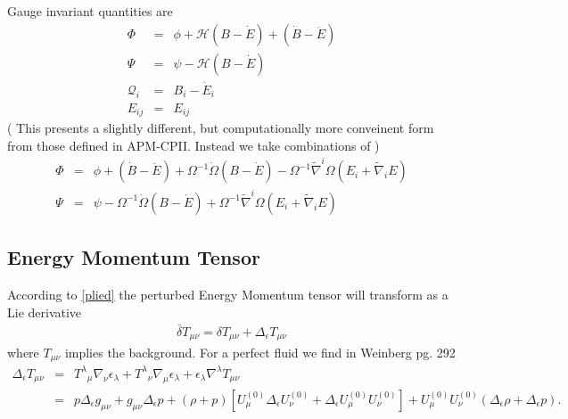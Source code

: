 \documentclass[10pt,letterpaper]{article}
\numberwithin{equation}{section}
\begin{document}
Gauge invariant quantities are 
\begin{eqnarray}
\Phi &=& \phi +\mathcal H (B-\dot E) + (\dot B-\ddot E)
\nonumber\\
\Psi &=& \psi - \mathcal H(B-\dot E)
\nonumber\\
\mathcal Q_i &=& B_i - \dot E_i
\nonumber\\
E_{ij} &=& E_{ij}
\end{eqnarray}
( This presents a slightly different, but computationally more conveinent form from those defined in APM-CPII. Instead we take combinations of )
\begin{eqnarray}
\Phi &=&\phi + (\dot B-\ddot E) + \Omega^{-1}\dot\Omega (B-\dot E) - \Omega^{-1}\tilde\nabla^i\Omega(E_i +\tilde\nabla_i E)
\nonumber\\
\Psi &=& \psi - \Omega^{-1}\dot\Omega(B-\dot E) + \Omega^{-1}\tilde\nabla^i \Omega (E_i +\tilde\nabla_i E)
\end{eqnarray}

\subsection{Energy Momentum Tensor}
According to \eqref{plied} the perturbed Energy Momentum tensor will transform as a Lie derivative
\begin{eqnarray}
\bar \delta T_{\mu\nu} = \delta T_{\mu\nu} + \Delta_\epsilon T_{\mu\nu}
\end{eqnarray}
where $T_{\mu\nu}$ implies the background. For a perfect fluid we find in Weinberg pg. 292 
\begin{eqnarray}
\Delta_\epsilon T_{\mu\nu} &=&  T^{\lambda}{}_\mu \nabla_\nu \epsilon_\lambda + T^{\lambda}{}_\nu \nabla_\mu \epsilon_\lambda + \epsilon_\lambda  \nabla^\lambda T_{\mu\nu}
\nonumber\\
&=&p\Delta_\epsilon g_{\mu\nu} + g_{\mu\nu} \Delta_\epsilon p 
+(\rho+p)\left[ U_\mu^{(0)} \Delta_\epsilon U_\nu^{(0)} + \Delta_\epsilon U_\mu^{(0)} U_\nu^{(0)}\right]
+ U_\mu^{(0)}U_\nu^{(0)} (\Delta_\epsilon \rho + \Delta_\epsilon p).
\end{eqnarray}
\end{document}
